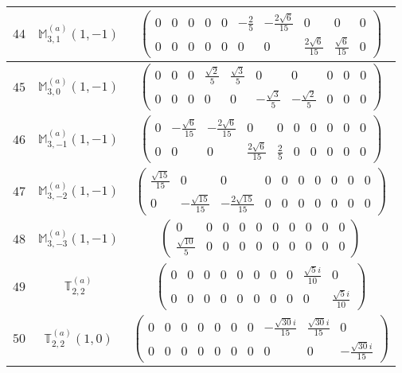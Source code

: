 \documentclass[fleqn,8pt,landscape]{jsarticle}
\begin{document}
\begin{center}
\begin{longtable}{ccc}
$ 44 $ & $ \mathbb{M}_{3,1}^{(a)}(1,-1) $ & $ \begin{pmatrix} 0 & 0 & 0 & 0 & 0 & - \frac{2}{5} & - \frac{2 \sqrt{6}}{15} & 0 & 0 & 0 \\ 0 & 0 & 0 & 0 & 0 & 0 & 0 & \frac{2 \sqrt{6}}{15} & \frac{\sqrt{6}}{15} & 0 \end{pmatrix} $ \\ \hline
$ 45 $ & $ \mathbb{M}_{3,0}^{(a)}(1,-1) $ & $ \begin{pmatrix} 0 & 0 & 0 & \frac{\sqrt{2}}{5} & \frac{\sqrt{3}}{5} & 0 & 0 & 0 & 0 & 0 \\ 0 & 0 & 0 & 0 & 0 & - \frac{\sqrt{3}}{5} & - \frac{\sqrt{2}}{5} & 0 & 0 & 0 \end{pmatrix} $ \\ \hline
$ 46 $ & $ \mathbb{M}_{3,-1}^{(a)}(1,-1) $ & $ \begin{pmatrix} 0 & - \frac{\sqrt{6}}{15} & - \frac{2 \sqrt{6}}{15} & 0 & 0 & 0 & 0 & 0 & 0 & 0 \\ 0 & 0 & 0 & \frac{2 \sqrt{6}}{15} & \frac{2}{5} & 0 & 0 & 0 & 0 & 0 \end{pmatrix} $ \\ \hline
$ 47 $ & $ \mathbb{M}_{3,-2}^{(a)}(1,-1) $ & $ \begin{pmatrix} \frac{\sqrt{15}}{15} & 0 & 0 & 0 & 0 & 0 & 0 & 0 & 0 & 0 \\ 0 & - \frac{\sqrt{15}}{15} & - \frac{2 \sqrt{15}}{15} & 0 & 0 & 0 & 0 & 0 & 0 & 0 \end{pmatrix} $ \\ \hline
$ 48 $ & $ \mathbb{M}_{3,-3}^{(a)}(1,-1) $ & $ \begin{pmatrix} 0 & 0 & 0 & 0 & 0 & 0 & 0 & 0 & 0 & 0 \\ \frac{\sqrt{10}}{5} & 0 & 0 & 0 & 0 & 0 & 0 & 0 & 0 & 0 \end{pmatrix} $ \\ \hline
$ 49 $ & $ \mathbb{T}_{2,2}^{(a)} $ & $ \begin{pmatrix} 0 & 0 & 0 & 0 & 0 & 0 & 0 & 0 & \frac{\sqrt{5} i}{10} & 0 \\ 0 & 0 & 0 & 0 & 0 & 0 & 0 & 0 & 0 & \frac{\sqrt{5} i}{10} \end{pmatrix} $ \\ \hline
$ 50 $ & $ \mathbb{T}_{2,2}^{(a)}(1,0) $ & $ \begin{pmatrix} 0 & 0 & 0 & 0 & 0 & 0 & 0 & - \frac{\sqrt{30} i}{15} & \frac{\sqrt{30} i}{15} & 0 \\ 0 & 0 & 0 & 0 & 0 & 0 & 0 & 0 & 0 & - \frac{\sqrt{30} i}{15} \end{pmatrix} $ \\ \hline

\end{longtable}
\end{center}
\end{document}
